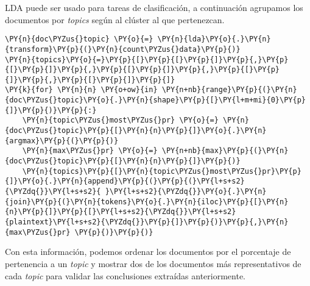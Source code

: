 LDA puede ser usado para tareas de clasificación, a continuación agrupamos los documentos por \textit{topics} según al clúster al que pertenezcan. 


\vspace{0.5cm}
    \begin{tcolorbox}[breakable, size=fbox, boxrule=1pt, pad at break*=1mm,colback=cellbackground, colframe=cellborder]
\begin{Verbatim}[commandchars=\\\{\}]
\PY{n}{doc\PYZus{}topic} \PY{o}{=} \PY{n}{lda}\PY{o}{.}\PY{n}{transform}\PY{p}{(}\PY{n}{count\PYZus{}data}\PY{p}{)}
\PY{n}{topics}\PY{o}{=}\PY{p}{[}\PY{p}{[}\PY{p}{]}\PY{p}{,}\PY{p}{[}\PY{p}{]}\PY{p}{,}\PY{p}{[}\PY{p}{]}\PY{p}{,}\PY{p}{[}\PY{p}{]}\PY{p}{,}\PY{p}{[}\PY{p}{]}\PY{p}{]}
\PY{k}{for} \PY{n}{n} \PY{o+ow}{in} \PY{n+nb}{range}\PY{p}{(}\PY{n}{doc\PYZus{}topic}\PY{o}{.}\PY{n}{shape}\PY{p}{[}\PY{l+m+mi}{0}\PY{p}{]}\PY{p}{)}\PY{p}{:}
    \PY{n}{topic\PYZus{}most\PYZus{}pr} \PY{o}{=} \PY{n}{doc\PYZus{}topic}\PY{p}{[}\PY{n}{n}\PY{p}{]}\PY{o}{.}\PY{n}{argmax}\PY{p}{(}\PY{p}{)}
    \PY{n}{max\PYZus{}pr} \PY{o}{=} \PY{n+nb}{max}\PY{p}{(}\PY{n}{doc\PYZus{}topic}\PY{p}{[}\PY{n}{n}\PY{p}{]}\PY{p}{)}
    \PY{n}{topics}\PY{p}{[}\PY{n}{topic\PYZus{}most\PYZus{}pr}\PY{p}{]}\PY{o}{.}\PY{n}{append}\PY{p}{(}\PY{p}{(}\PY{l+s+s2}{\PYZdq{}}\PY{l+s+s2}{ }\PY{l+s+s2}{\PYZdq{}}\PY{o}{.}\PY{n}{join}\PY{p}{(}\PY{n}{tokens}\PY{o}{.}\PY{n}{iloc}\PY{p}{[}\PY{n}{n}\PY{p}{]}\PY{p}{[}\PY{l+s+s2}{\PYZdq{}}\PY{l+s+s2}{plaintext}\PY{l+s+s2}{\PYZdq{}}\PY{p}{]}\PY{p}{)}\PY{p}{,}\PY{n}{max\PYZus{}pr} \PY{p}{)}\PY{p}{)}
\end{Verbatim}
\end{tcolorbox}


Con esta información, podemos ordenar los documentos por el porcentaje de pertenencia a un \textit{topic} y mostrar dos de los documentos más representativos de cada \textit{topic} para validar las conclusiones extraídas anteriormente. 
\vspace{0.5cm}

